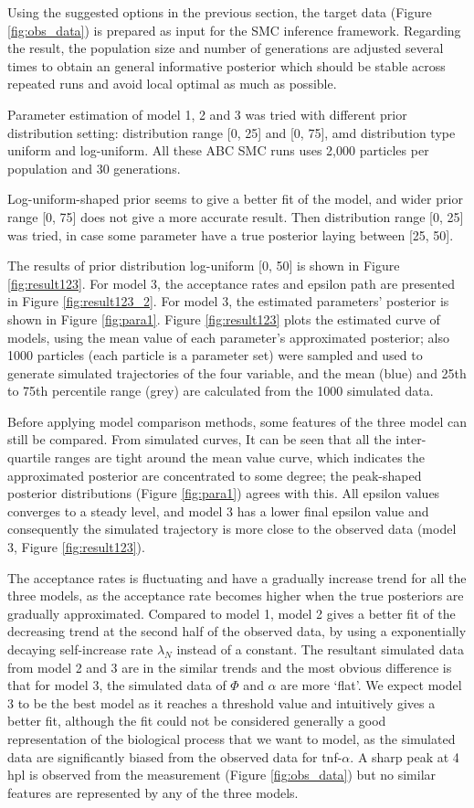 Using the suggested options in the previous section, the target data (Figure \ref{fig:obs_data}) is prepared as input for the SMC inference framework. Regarding the result, the population size and number of generations are adjusted several times to obtain an general informative posterior which should be stable across repeated runs and avoid local optimal as much as possible.

Parameter estimation of model 1, 2 and 3 was tried with different prior distribution setting: distribution range [0, 25] and [0, 75], amd distribution type uniform and log-uniform. All these ABC SMC runs uses 2,000 particles per population and 30 generations.

Log-uniform-shaped prior seems to give a better fit of the model, and wider prior range [0, 75] does not give a more accurate result. Then distribution range [0, 25] was tried, in case some parameter have a true posterior laying between [25, 50].

The results of prior distribution log-uniform [0, 50] is shown in Figure \ref{fig:result123}. For model 3, the acceptance rates and epsilon path are presented in Figure \ref{fig:result123_2}. For model 3, the estimated parameters' posterior is shown in Figure \ref{fig:para1}. Figure \ref{fig:result123} plots the estimated curve of models, using the mean value of each parameter's approximated posterior; also 1000 particles (each particle is a parameter set) were sampled and used to generate simulated trajectories of the four variable, and the mean (blue) and 25th to 75th percentile range (grey) are calculated from the 1000 simulated data.

Before applying model comparison methods, some features of the three model can still be compared. From simulated curves, It can be seen that all the inter-quartile ranges are tight around the mean value curve, which indicates the approximated posterior are concentrated to some degree; the peak-shaped posterior distributions (Figure \ref{fig:para1}) agrees with this. All epsilon values converges to a steady level, and model 3 has a lower final epsilon value and consequently the simulated trajectory is more close to the observed data (model 3, Figure \ref{fig:result123}).

The acceptance rates is fluctuating and have a gradually increase trend for all the three models, as the acceptance rate becomes higher when the true posteriors are gradually approximated. Compared to model 1, model 2 gives a better fit of the decreasing trend at the second half of the observed data, by using a exponentially decaying self-increase rate $\lambda_N$ instead of a constant. The resultant simulated data from model 2 and 3 are in the similar trends and the most obvious difference is that for model 3, the simulated data of $\Phi$ and $\alpha$ are more `flat'. We expect model 3 to be the best model as it reaches a threshold value and intuitively gives a better fit, although the fit could not be considered generally a good representation of the biological process that we want to model, as the simulated data are significantly biased from the observed data for tnf-$\alpha$. A sharp peak at 4 hpl is observed from the measurement (Figure \ref{fig:obs_data}) but no similar features are represented by any of the three models.


